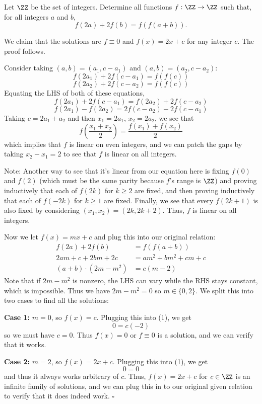 
\begin{problem}[ISL 2019 A1]
    Let $\ZZ$ be the set of integers. Determine all functions $f : \ZZ \to \ZZ$
    such that, for all integers $a$ and $b$, \[f(2a)+2f(b)=f(f(a+b)).\]
\end{problem}

\begin{solution}[Ritwin]
    We claim that the solutions are $f \equiv 0$ and $f(x) = 2x+c$ for any
    integer $c$. The proof follows.
    
    Consider taking $(a, b) = (a_1, c-a_1)$ and $(a, b) = (a_2, c-a_2)$:
    \[f(2a_1) + 2f(c-a_1) = f(f(c))\]
    \[f(2a_2) + 2f(c-a_2) = f(f(c))\]
    Equating the LHS of both of these equations,
    \[f(2a_1) + 2f(c-a_1) = f(2a_2) + 2f(c-a_2)\]
    \[f(2a_1) - f(2a_2) = 2f(c-a_2) - 2f(c-a_1)\]
    Taking $c = 2a_1+a_2$ and then $x_1 = 2a_1$, $x_2 = 2a_2$, we see that
    \[f\!\left(\frac{x_1+x_2}{2}\right) = \frac{f(x_1) + f(x_2)}{2}\]
    which implies that $f$ is linear on even integers, and we can patch the
    gaps by taking $x_2-x_1 = 2$ to see that $f$ is linear on all integers.
    
    Note: Another way to see that it's linear from our equation here is fixing
    $f(0)$ and $f(2)$ (which must be the same parity because $f$'s range is $\ZZ$)
    and proving inductively that each of $f(2k)$ for $k \geq 2$ are fixed, and
    then proving inductively that each of $f(-2k)$ for $k \geq 1$ are fixed.
    Finally, we see that every $f(2k+1)$ is also fixed by considering $(x_1, x_2) = (2k, 2k+2)$.
    Thus, $f$ is linear on all integers.
    
    Now we let $f(x) = mx+c$ and plug this into our original relation:
    \begin{align}
        f(2a) + 2f(b) &= f(f(a+b))\nonumber\\
        2am + c + 2bm + 2c &= am^2 + bm^2 + cm + c\nonumber\\
        (a+b) \cdot (2m-m^2) &= c(m-2) \tag{1}
    \end{align}
    Note that if $2m-m^2$ is nonzero, the LHS can vary while the RHS stays
    constant, which is impossible. Thus we have $2m-m^2=0$ so $m \in \{0,2\}$.
    We split this into two cases to find all the solutions:
    
    \textbf{Case 1: } $m = 0$, so $f(x) = c$. Plugging this into (1), we get
    \[0 = c(-2)\]
    so we must have $c=0$. Thus $f(x) = 0$ or $f \equiv 0$ is a solution, and
    we can verify that it works.
    
    \textbf{Case 2: } $m = 2$, so $f(x) = 2x+c$. Plugging this into (1), we get
    \[0 = 0\]
    and thus it always works arbitrary of $c$. Thus, $f(x) = 2x+c$ for $c \in \ZZ$
    is an infinite family of solutions, and we can plug this in to our original
    given relation to verify that it does indeed work. $\square$
\end{solution}

